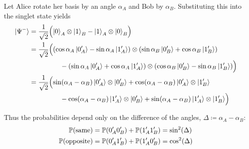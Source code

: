 Let Alice rotate her basis by an angle $\alpha_A$ and Bob by $\alpha_B$.
Substituting this into the singlet state yields
\[
\begin{aligned}
\ket{\Psi^-}
&=
\frac{1}{\sqrt{2}}
\Bigl(
\ket{0}_A\otimes\ket{1}_B
-
\ket{1}_A\otimes\ket{0}_B
\Bigr)
\\
&=
\frac{1}{\sqrt{2}}
\Bigl(
(\cos\alpha_A\ket{0_A'}-\sin\alpha_A\ket{1_A'})
\otimes
(\sin\alpha_B\ket{0_B'}+\cos\alpha_B\ket{1_B'})
\\
&\hspace{1.6cm}
-
(\sin\alpha_A\ket{0_A'}+\cos\alpha_A\ket{1_A'})
\otimes
(\cos\alpha_B\ket{0_B'}-\sin\alpha_B\ket{1_B'})
\Bigr)\\
&=
\frac{1}{\sqrt{2}}
\Bigl(
\sin(\alpha_A-\alpha_B)\ket{0_A'}\otimes\ket{0_B'}
+
\cos(\alpha_A-\alpha_B)\ket{0_A'}\otimes\ket{1_B'}
\\
&\hspace{1.6cm}
-
\cos(\alpha_A-\alpha_B)\ket{1_A'}\otimes\ket{0_B'}
+
\sin(\alpha_A-\alpha_B)\ket{1_A'}\otimes\ket{1_B'}
\Bigr)
\end{aligned}
\]



Thus the probabilities depend only on the difference of the angles,
\(
\Delta \coloneq \alpha_A-\alpha_B
\):
\[
\begin{aligned}
\operatorname{\mathbb{P}}(\text{same})
&=
\operatorname{\mathbb{P}}(0_A'0_B')+\operatorname{\mathbb{P}}(1_A'1_B')
=
\sin^2(\Delta)
\\
\operatorname{\mathbb{P}}(\text{opposite})
&=
\operatorname{\mathbb{P}}(0_A'1_B')+\operatorname{\mathbb{P}}(1_A'0_B')
=
\cos^2(\Delta)
\end{aligned}
\]





